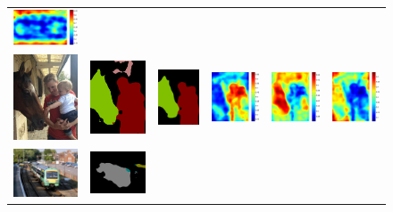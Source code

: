 \documentclass[10pt,twocolumn,letterpaper]{article}
\begin{document}
\begin{figure}
\begin{tabular}{c c c c c c}
   \includegraphics[height=0.087\linewidth]{fig/coco/att3/COCO_val2014_000000000985.pdf} \\
   \includegraphics[height=0.13\linewidth]{fig/coco/img/COCO_val2014_000000012748.jpg} &
   \includegraphics[height=0.13\linewidth]{fig/coco/res_baseline/COCO_val2014_000000012748.png} &
   \includegraphics[height=0.13\linewidth]{fig/coco/res_sharenet/COCO_val2014_000000012748.png} &
   \includegraphics[height=0.13\linewidth]{fig/coco/att1/COCO_val2014_000000012748.pdf} &
   \includegraphics[height=0.13\linewidth]{fig/coco/att2/COCO_val2014_000000012748.pdf} &
   \includegraphics[height=0.13\linewidth]{fig/coco/att3/COCO_val2014_000000012748.pdf} \\
   \includegraphics[height=0.1\linewidth]{fig/coco/img/COCO_val2014_000000000923.jpg} &
   \includegraphics[height=0.1\linewidth]{fig/coco/res_baseline/COCO_val2014_000000000923.png} &

\end{tabular}
\end{figure}
\end{document}
